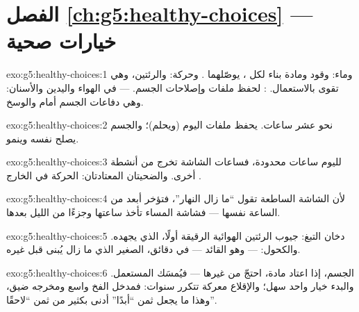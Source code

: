 \section*{الفصل \ref{ch:g5:healthy-choices} --- خيارات صحية}

\begin{solution}{exo:g5:healthy-choices:1}
 وماء: وقود ومادة بناء لكل ، يوصّلهما . وحركة:
   والرئتين، وهي تقوى بالاستعمال. : لحفظ
ملفات  وإصلاحات الجسم.  --- في الهواء واليدين والأسنان:
وهي دفاعات الجسم أمام  والوسخ.
\end{solution}

\begin{solution}{exo:g5:healthy-choices:2}
نحو عشر ساعات.  يحفظ ملفات اليوم (ويحلم)؛ والجسم يصلح نفسه
وينمو.
\end{solution}

\begin{solution}{exo:g5:healthy-choices:3}
لليوم ساعات محدودة، فساعات الشاشة تخرج من أنشطة أخرى. والضحيتان
المعتادتان: الحركة في الخارج .
\end{solution}

\begin{solution}{exo:g5:healthy-choices:4}
لأن الشاشة الساطعة تقول  ``ما زال النهار''، فتؤخر  أبعد
من الساعة نفسها --- فشاشة المساء تأخذ ساعتها وجزءًا من الليل بعدها.
\end{solution}

\begin{solution}{exo:g5:healthy-choices:5}
دخان التبغ: جيوب الرئتين الهوائية الرقيقة أولًا،  الذي
يجهده. والكحول:  --- وهو القائد --- في دقائق،  الصغير
الذي ما زال يُبنى قبل غيره.
\end{solution}

\begin{solution}{exo:g5:healthy-choices:6}
الجسم، إذا اعتاد مادة، احتجّ من غيرها --- فيُمسَك المستعمل. والبدء
خيار واحد سهل؛ والإقلاع معركة تتكرر سنوات: فمدخل الفخ واسع ومخرجه
ضيق، وهذا ما يجعل ثمن ``أبدًا'' أدنى بكثير من ثمن ``لاحقًا''.
\end{solution}

